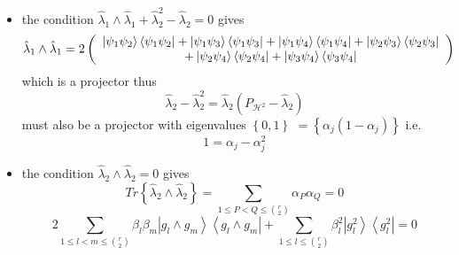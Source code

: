 \documentclass[aps,preprint]{revtex4}%
\begin{document}
\begin{itemize}
\item the condition $\hat{\lambda}_{1}\wedge\hat{\lambda}_{1}+\hat{\lambda
}_{2}^{2}-\hat{\lambda}_{2}=0$ gives%
\begin{equation}
\hat{\lambda}_{1}\wedge\hat{\lambda}_{1}=2\left(
\begin{array}
[c]{c}%
\left\vert \psi_{1}\psi_{2}\right\rangle \left\langle \psi_{1}\psi
_{2}\right\vert +\left\vert \psi_{1}\psi_{3}\right\rangle \left\langle
\psi_{1}\psi_{3}\right\vert +\left\vert \psi_{1}\psi_{4}\right\rangle
\left\langle \psi_{1}\psi_{4}\right\vert +\left\vert \psi_{2}\psi
_{3}\right\rangle \left\langle \psi_{2}\psi_{3}\right\vert \\
+\left\vert \psi_{2}\psi_{4}\right\rangle \left\langle \psi_{2}\psi
_{4}\right\vert +\left\vert \psi_{3}\psi_{4}\right\rangle \left\langle
\psi_{3}\psi_{4}\right\vert
\end{array}
\right)
\end{equation}
which is a projector thus
\begin{equation}
\hat{\lambda}_{2}-\hat{\lambda}_{2}^{2}=\hat{\lambda}_{2}\left(
P_{\mathcal{H}^{2}}-\hat{\lambda}_{2}\right)
\end{equation}
must also be a projector with eigenvalues $\left\{  0,1\right\}  $ $=\left\{
\alpha_{j}\left(  1-\alpha_{j}\right)  \right\}  $ i.e.
\begin{equation}
1=\alpha_{j}-\alpha_{j}^{2}%
\end{equation}


\item the condition $\hat{\lambda}_{2}\wedge\hat{\lambda}_{2}=0$ gives
\begin{equation}
Tr\left\{  \hat{\lambda}_{2}\wedge\hat{\lambda}_{2}\right\}  =\sum_{1\leq
P<Q\leq\binom{r}{2}}\alpha_{P}\alpha_{Q}=0
\end{equation}%
\begin{equation}
2\sum_{1\leq l<m\leq\binom{r}{2}}\beta_{l}\beta_{m}\left\vert g_{l}\wedge
g_{m}\right\rangle \left\langle g_{l}\wedge g_{m}\right\vert +\sum_{1\leq
l\leq\binom{r}{2}}\beta_{l}^{2}\left\vert g_{l}^{2}\right\rangle \left\langle
g_{l}^{2}\right\vert =0
\end{equation}



\end{itemize}
\end{document}
